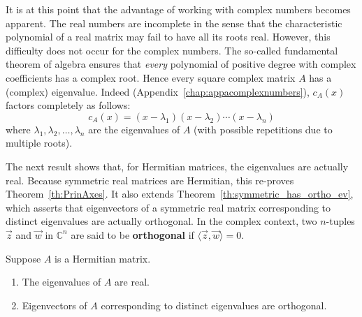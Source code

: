\documentclass{ximera}
\begin{document}
It is at this point that the advantage
of working with complex numbers becomes apparent. The real numbers are
incomplete in the sense that the characteristic polynomial of a real
matrix may fail to have all its roots real. However, this difficulty
does not occur for the complex numbers. The so-called fundamental
theorem of algebra ensures that \textit{every} polynomial of positive degree with complex coefficients has a complex root. Hence every square complex matrix $A$ has a (complex) eigenvalue. Indeed (Appendix~\ref{chap:appacomplexnumbers}), $c_{A}(x)$ factors completely as follows:
\begin{equation*}
c_{A}(x) = (x -\lambda_{1})(x -\lambda_{2}) \cdots (x -\lambda_{n})
\end{equation*}
where $\lambda_{1}, \lambda_{2}, \ldots, \lambda_{n}$ are the eigenvalues of $A$ (with possible repetitions due to multiple roots).

The next result shows that, for
Hermitian matrices, the eigenvalues are actually real. Because symmetric
 real matrices are Hermitian, this re-proves Theorem~\ref{th:PrinAxes}. It also extends Theorem~\ref{th:symmetric_has_ortho_ev},
 which asserts that eigenvectors of a symmetric real matrix
corresponding to distinct eigenvalues are actually orthogonal. In the
complex context, two $n$-tuples $\vec{z}$ and $\vec{w}$ in $\mathbb{C}^n$ are said to be \textbf{orthogonal} if $\langle \vec{z}, \vec{w} \rangle = 0$.


\begin{theorem}\label{th:025729}
Suppose $A$ is a Hermitian matrix.

\begin{enumerate}
\item\label{th:025729a} The eigenvalues of $A$ are real.

\item\label{th:025729b} Eigenvectors of $A$ corresponding to distinct eigenvalues are orthogonal.

\end{enumerate}
\end{theorem}
\end{document}
